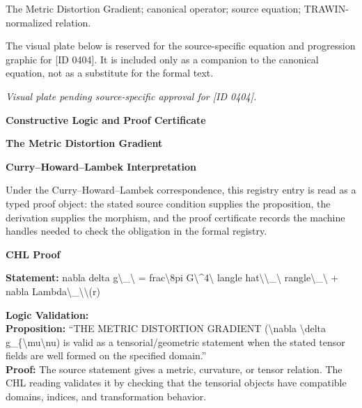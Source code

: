 The Metric Distortion Gradient; canonical operator; source equation; TRAWIN-normalized relation.
\endgroup

\begingroup\footnotesize\sloppy
The visual plate below is reserved for the source-specific equation and progression graphic for [ID 0404]. It is included only as a companion to the canonical equation, not as a substitute for the formal text.
\par\endgroup
\begingroup\footnotesize\itshape
Visual plate pending source-specific approval for [ID 0404].
\par\endgroup

\clearpage
\begingroup\tzpsupportsetup
\noindent\textbf{\fontsize{10.8pt}{12.8pt}\selectfont [ID 0404] Constructive Logic and Proof Certificate}\par
\noindent\textbf{\fontsize{10pt}{12pt}\selectfont The Metric Distortion Gradient}\par
\vspace{0.45em}
\begingroup
\footnotesize
\setlength{\parskip}{0.22em}
\setlength{\parindent}{0pt}
\noindent\textbf{Curry--Howard--Lambek Interpretation}\par
Under the Curry--Howard--Lambek correspondence, this registry entry is read as a typed proof
object: the stated source condition supplies the proposition, the derivation supplies the
morphism, and the proof certificate records the machine handles needed to check the obligation
in the formal registry.

\vspace{0.45em}
\noindent\textbf{CHL Proof}\par
\textbf{Statement:} nabla delta g\textbackslash{}\_\textbackslash{} = frac\textbackslash{}8pi G\textbackslash{}\textasciicircum{}4\textbackslash{} langle hat\textbackslash{}\textbackslash{}\_\textbackslash{} rangle\textbackslash{}\_\textbackslash{} + nabla Lambda\textbackslash{}\_\textbackslash{}\textbackslash{}(r)

\textbf{Logic Validation:}\\
\textbf{Proposition:} ``THE METRIC DISTORTION GRADIENT (\textbackslash{}nabla \textbackslash{}delta g\_\{\textbackslash{}mu\textbackslash{}nu) is valid as a
tensorial/geometric statement when the stated tensor fields are well formed on the
specified domain.''\\
\textbf{Proof:} The source statement gives a metric, curvature, or tensor relation. The CHL reading
validates it by checking that the tensorial objects have compatible domains, indices,
and transformation behavior.

